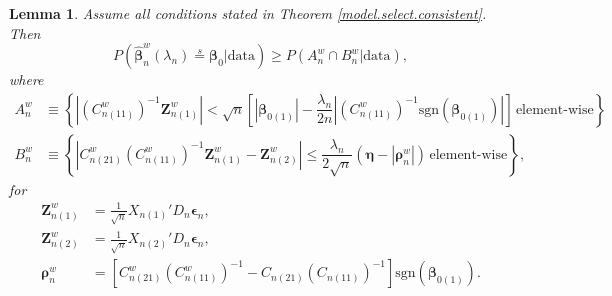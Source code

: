 \documentclass[12pt]{article}
\newcommand{\bnw}{\widehat{\bm{\beta}}_n^w} %
\newcommand{\be}{\bm{\beta}} %
\newcommand{\ep}{\bm{\epsilon}} %
\newcommand{\dqn}{\frac{1}{\sqrt{n}}} %
\newcommand{\cnwa}{C_{n(11)}^w}
\newcommand{\cnwc}{C_{n(21)}^w}
\newcommand{\znwa}{\bm{Z}_{n(1)}^w}
\newcommand{\znwb}{\bm{Z}_{n(2)}^w}
\newtheorem{lem}{Lemma}[section]
\begin{document}
\begin{lem} \label{lem_model.select}
	Assume all conditions stated in Theorem \ref{model.select.consistent}. Then
	$$
	P\left(
		\bnw (\lambda_n) \stackrel{s}{=} \be_0
		\bigg| \text{data}
	\right)	
	\geq P \left( 
				A_n^w \cap B_n^w 
				\big| \text{data}
			\right), 
	$$ 
	where
	\begin{align*}
	A_n^w &\equiv 
	\left\{
		\left|
			\left( \cnwa \right)^{-1} \znwa 
		\right| 
		< \sqrt{n}
			\left[
				\left| \be_{0(1)} \right|
				- \dfrac{\lambda_n}{2n} 
					\left|
						\left( \cnwa \right)^{-1} 
						\text{sgn} 
						\left( \be_{0(1)} \right) 
					\right|
			\right]
		\, \text{element-wise}
	\right\} \\
	B_n^w &\equiv
	\left\{
		\left|
			\cnwc \left( \cnwa \right)^{-1} \znwa - \znwb 
		\right| 
		\leq \dfrac{\lambda_n}{2 \sqrt{n}}
			\left(
				\bm{\eta} 
				- \left| \bm{\rho}_n^w \right| 
			\right)
		\, \text{element-wise}
	\right\},
	\end{align*}
	for
	\begin{align*}
	\znwa &= \dqn X_{n(1)}' D_n \ep_n, \\
	\znwb &= \dqn X_{n(2)}' D_n \ep_n, \\
	\bm{\rho}_n^w  
	&= \left[
			\cnwc \left(\cnwa\right)^{-1}
			- C_{n(21)} \left( C_{n(11)} \right)^{-1} 
		\right]
		\text{sgn} 
		\left( \be_{0(1)} \right).
	\end{align*}
\end{lem}
\end{document}
